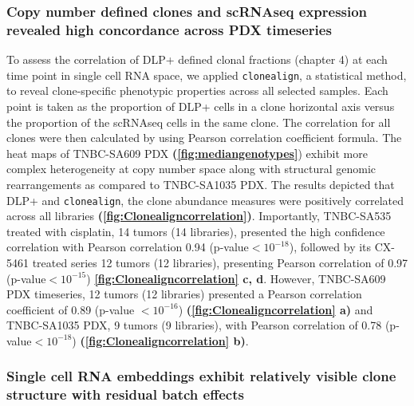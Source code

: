 \subsubsection{Copy number defined clones and scRNAseq expression revealed high concordance across PDX timeseries}
 To assess the correlation of DLP+ defined clonal fractions (chapter 4) at each time point in single cell RNA space, we applied \texttt{clonealign}, a statistical method, \cite{campbell2019clonealign} to reveal clone-specific phenotypic properties across all selected samples.
  Each point is taken as the proportion of DLP+ cells in a clone horizontal axis versus the proportion of the scRNAseq cells in the same clone. The  correlation for all clones were then calculated by using Pearson correlation coefficient formula. The heat maps of TNBC-SA609 PDX \textbf{(\autoref{fig:mediangenotypes}}) exhibit more complex heterogeneity at copy number space along with structural genomic rearrangements as compared to TNBC-SA1035 PDX. The results depicted that DLP+ and \texttt{clonealign}, the  clone abundance measures were positively correlated across all libraries \textbf{(\autoref{fig:Clonealigncorrelation})}. Importantly, TNBC-SA535 treated with cisplatin, 14 tumors (14 libraries), presented the high confidence correlation with Pearson correlation 0.94 (p-value$< 10^{-18}$), followed by its CX-5461 treated series 12 tumors (12 libraries), presenting Pearson correlation of 0.97 (p-value$< 10^{-15}$) \textbf{\autoref{fig:Clonealigncorrelation} c, d}. However, TNBC-SA609 PDX timeseries, 12 tumors (12 libraries) presented a Pearson correlation coefficient of 0.89 (p-value $< 10^{-16}$) \textbf{(\autoref{fig:Clonealigncorrelation} a)} and TNBC-SA1035 PDX, 9 tumors (9 libraries), with Pearson correlation of 0.78 (p-value$< 10^{-18}$) \textbf{(\autoref{fig:Clonealigncorrelation} b)}.
  
  
\subsubsection{Single cell RNA embeddings exhibit relatively visible clone structure with residual batch effects}

